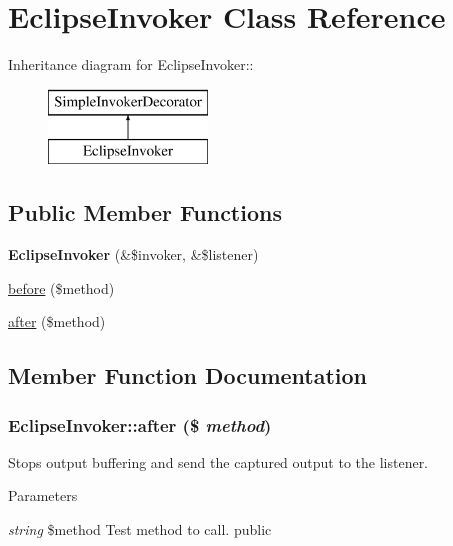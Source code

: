 \hypertarget{class_eclipse_invoker}{
\section{EclipseInvoker Class Reference}
\label{class_eclipse_invoker}
}
Inheritance diagram for EclipseInvoker::\begin{figure}[H]
\begin{center}
\leavevmode
\includegraphics[height=2cm]{class_eclipse_invoker}
\end{center}
\end{figure}
\subsection*{Public Member Functions}
\begin{DoxyCompactItemize}
\item 
\hypertarget{class_eclipse_invoker_aadba4024365d63c6ee52adfbd357211d}{
{\bfseries EclipseInvoker} (\&\$invoker, \&\$listener)}
\label{class_eclipse_invoker_aadba4024365d63c6ee52adfbd357211d}

\item 
\hyperlink{class_eclipse_invoker_a0f16409fb93e1e0e1d6ff703a0f9f1cf}{before} (\$method)
\item 
\hyperlink{class_eclipse_invoker_a7d9cfe918be1c61e93dfd8eb31ef5b46}{after} (\$method)
\end{DoxyCompactItemize}


\subsection{Member Function Documentation}
\hypertarget{class_eclipse_invoker_a7d9cfe918be1c61e93dfd8eb31ef5b46}{
\subsubsection[{after}]{\setlength{\rightskip}{0pt plus 5cm}EclipseInvoker::after (\$ {\em method})}}
\label{class_eclipse_invoker_a7d9cfe918be1c61e93dfd8eb31ef5b46}
Stops output buffering and send the captured output to the listener. 
\begin{DoxyParams}{Parameters}
\item[{\em string}]\$method Test method to call.  public \end{DoxyParams}


